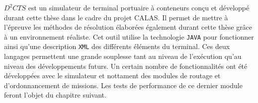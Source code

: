 $D^2CTS$ est un simulateur de terminal portuaire à conteneurs conçu et développé durant cette thèse dans le cadre du projet CALAS. Il permet de mettre à l'épreuve les méthodes de résolution élaborées également durant cette thèse grâce à un environnement réaliste.
Cet outil utilise la technologie \verb!JAVA! pour fonctionner ainsi qu'une description \verb!XML! des différents éléments du terminal. Ces deux langages permettent une grande souplesse tant au niveau de l'exécution qu'au niveau des développements futurs.
Un certain nombre de fonctionnalités ont été développées avec le simulateur et nottament des modules de routage et d'ordonnancement de missions. Les tests de performance de ce dernier module feront l'objet du chapitre suivant.